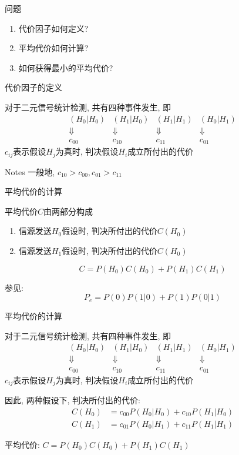 \begin{frame}{问题}
\begin{enumerate}
	\item 代价因子如何定义?
	\item 平均代价如何计算?
	\item 如何获得最小的平均代价?
\end{enumerate}
\end{frame}

\begin{frame}{代价因子的定义}
\begin{block}{对于二元信号统计检测, 共有四种事件发生, 即}
$$
\begin{array}{cccc}
	(H_0|H_0) & (H_1|H_0) & (H_1|H_1) & (H_0|H_1)\\
	\Downarrow & \Downarrow & \Downarrow & \Downarrow\\
	c_{00} & c_{10} & c_{11} & c_{01}
\end{array}
$$
$c_{ij}$表示假设$H_j$为真时, 判决假设$H_i$成立所付出的代价
\end{block}
\begin{block}{Notes}
	一般地, $c_{10}>c_{00}, c_{01}>c_{11}$
\end{block}
\end{frame}

\begin{frame}{平均代价的计算}
\begin{block}{平均代价$C$由两部分构成}
	\begin{enumerate}
		\item 信源发送$H_0$假设时, 判决所付出的代价$C(H_0)$
		\item 信源发送$H_1$假设时, 判决所付出的代价$C(H_0)$
	\end{enumerate}
    \[C=P(H_0)C(H_0)+P(H_1)C(H_1)\]
\end{block}
参见:
\[ P_e=P(0)P(1|0)+P(1)P(0|1)\]
\end{frame}

\begin{frame}{平均代价的计算}
\begin{block}{对于二元信号统计检测, 共有四种事件发生, 即}
	$$
	\begin{array}{cccc}
	(H_0|H_0) & (H_1|H_0) & (H_1|H_1) & (H_0|H_1)\\
	\Downarrow & \Downarrow & \Downarrow & \Downarrow\\
	c_{00} & c_{10} & c_{11} & c_{01}
	\end{array}
	$$
	$c_{ij}$表示假设$H_j$为真时, 判决假设$H_i$成立所付出的代价
\end{block}
\begin{block}{因此, 两种假设下, 判决所付出的代价: }
   \begin{align*}
   C(H_0)&=c_{00}P(H_0|H_0)+c_{10}P(H_1|H_0)\\
   C(H_1)&=c_{01}P(H_0|H_1)+c_{11}P(H_1|H_1)
   \end{align*}
\end{block}
 平均代价: $C=P(H_0)C(H_0)+P(H_1)C(H_1)$
\end{frame}

